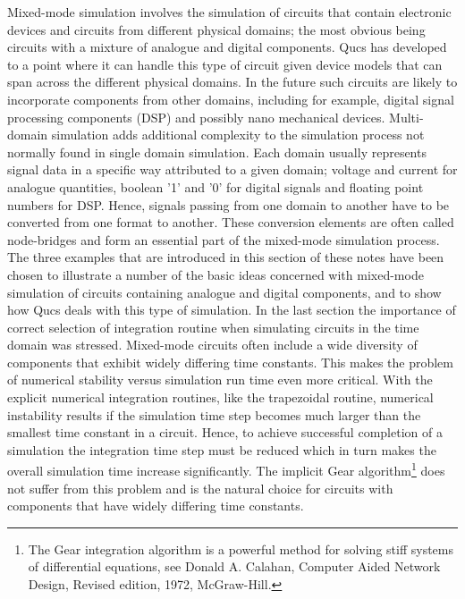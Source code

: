 
Mixed-mode simulation involves the simulation of circuits that contain
electronic devices and circuits from different physical domains; the
most obvious being circuits with a mixture of analogue and digital
components.  Qucs has developed to a point where it can handle this
type of circuit given device models that can span across the different
physical domains. In the future such circuits are likely to
incorporate components from other domains, including for example,
digital signal processing components (DSP) and possibly nano
mechanical devices.  Multi-domain simulation adds additional
complexity to the simulation process not normally found in single
domain simulation.  Each domain usually represents signal data in a
specific way attributed to a given domain; voltage and current for
analogue quantities, boolean '1' and '0' for digital signals and
floating point numbers for DSP.  Hence, signals passing from one
domain to another have to be converted from one format to
another. These conversion elements are often called node-bridges and
form an essential part of the mixed-mode simulation process.  The
three examples that are introduced in this section of these notes have
been chosen to illustrate a number of the basic ideas concerned with
mixed-mode simulation of circuits containing analogue and digital
components, and to show how Qucs deals with this type of simulation.
In the last section the importance of correct selection of integration
routine when simulating circuits in the time domain was stressed.
Mixed-mode circuits often include a wide diversity of components that
exhibit widely differing time constants.  This makes the problem of
numerical stability versus simulation run time even more critical.
With the explicit numerical integration routines, like the trapezoidal
routine, numerical instability results if the simulation time step
becomes much larger than the smallest time constant in a circuit.
Hence, to achieve successful completion of a simulation the
integration time step must be reduced which in turn makes the overall
simulation time increase significantly.  The implicit Gear
algorithm\footnote{The Gear integration algorithm is a powerful method
for solving stiff systems of differential equations, see Donald
A. Calahan, Computer Aided Network Design, Revised edition, 1972,
McGraw-Hill.} does not suffer from this problem and is the natural
choice for circuits with components that have widely differing time
constants.

